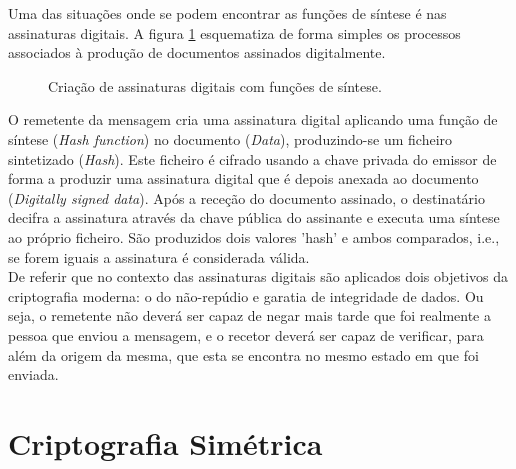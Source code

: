 \documentclass[a4paper,11pt,openright,oneside]{report}
\begin{document}
Uma das situações onde se podem encontrar as funções de síntese é nas assinaturas digitais. A figura \ref{fig:crypto5} esquematiza de forma simples os processos associados à produção de documentos assinados digitalmente.

\begin{figure}[ht]
\center
{}
\caption{Criação de assinaturas digitais com funções de síntese.}
\label{fig:crypto5}
\end{figure}

O remetente da mensagem cria uma assinatura digital aplicando uma função de síntese (\textit{Hash function}) no documento (\textit{Data}), produzindo-se um ficheiro sintetizado (\textit{Hash}). Este ficheiro é cifrado usando a chave privada do emissor de forma a produzir uma assinatura digital que é depois anexada ao documento (\textit{Digitally signed data}). Após a receção do documento assinado, o destinatário decifra a assinatura através da chave pública do assinante e executa uma síntese ao próprio ficheiro. São produzidos dois valores 'hash' e ambos comparados, i.e., se forem iguais a assinatura é considerada válida.\\

De referir que no contexto das assinaturas digitais são aplicados dois objetivos da criptografia moderna: o do não-repúdio e garatia de integridade de dados. Ou seja, o remetente não deverá ser capaz de negar mais tarde que foi realmente a pessoa que enviou a mensagem, e o recetor deverá ser capaz de verificar, para além da origem da mesma, que esta se encontra no mesmo estado em que foi enviada.

\section{Criptografia Simétrica}
\label{chalp.simétrica}
\end{document}
